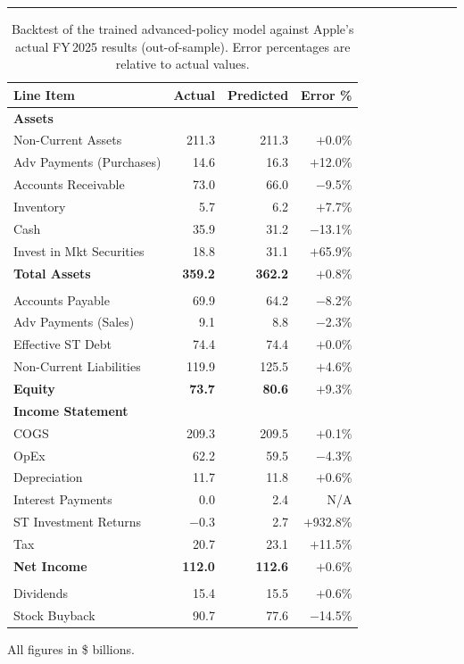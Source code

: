 \documentclass[12pt,a4paper]{article}
\begin{document}
\noindent\rule{\textwidth}{0.4pt}


\begin{table}[H]
\centering
\small
\vspace{0.5em}

\begin{tabular}{l rrr}
\toprule
\textbf{Line Item} & \textbf{Actual} & \textbf{Predicted} & \textbf{Error \%} \\
\midrule
\multicolumn{4}{l}{\textbf{Assets}} \\
Non-Current Assets        & 211.3 & 211.3 & $+$0.0\% \\
Adv Payments (Purchases)  &  14.6 &  16.3 & $+$12.0\% \\
Accounts Receivable       &  73.0 &  66.0 & $-$9.5\% \\
Inventory                 &   5.7 &   6.2 & $+$7.7\% \\
Cash                      &  35.9 &  31.2 & $-$13.1\% \\
Invest in Mkt Securities  &  18.8 &  31.1 & $+$65.9\% \\
\textbf{Total Assets}     & \textbf{359.2} & \textbf{362.2} & $+$0.8\% \\
\addlinespace
\multicolumn{4}{l}{\textbf{Liabilities}} \\
Accounts Payable          &  69.9 &  64.2 & $-$8.2\% \\
Adv Payments (Sales)      &   9.1 &   8.8 & $-$2.3\% \\
Effective ST Debt         &  74.4 &  74.4 & $+$0.0\% \\
Non-Current Liabilities   & 119.9 & 125.5 & $+$4.6\% \\
\textbf{Equity}           & \textbf{73.7} & \textbf{80.6} & $+$9.3\% \\
\midrule
\multicolumn{4}{l}{\textbf{Income Statement}} \\
COGS                      & 209.3 & 209.5 & $+$0.1\% \\
OpEx                      &  62.2 &  59.5 & $-$4.3\% \\
Depreciation              &  11.7 &  11.8 & $+$0.6\% \\
Interest Payments         &   0.0 &   2.4 & N/A \\
ST Investment Returns     &  $-$0.3 &   2.7 & $+$932.8\% \\
Tax                       &  20.7 &  23.1 & $+$11.5\% \\
\textbf{Net Income}       & \textbf{112.0} & \textbf{112.6} & $+$0.6\% \\
\addlinespace
\multicolumn{4}{l}{\textbf{Cash Flow}} \\
Dividends                 &  15.4 &  15.5 & $+$0.6\% \\
Stock Buyback             &  90.7 &  77.6 & $-$14.5\% \\
\bottomrule
\end{tabular}
\par\smallskip
{\footnotesize All figures in \$ billions.}
\caption{Backtest of the trained advanced-policy model against Apple's actual FY\,2025 results (out-of-sample). Error percentages are relative to actual values.}
\label{tab:backtest_advpolicies}
\end{table}
\end{document}
